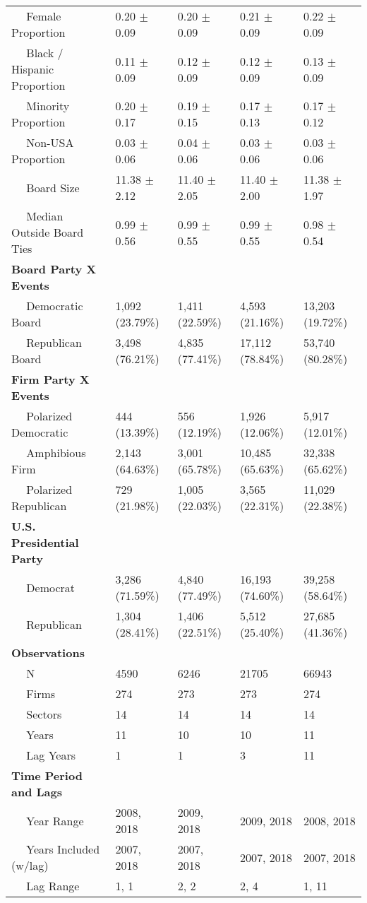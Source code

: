 \begin{tabular}{lllll}
~~ Female Proportion & 0.20 $\pm$ 0.09 & 0.20 $\pm$ 0.09 & 0.21 $\pm$ 0.09 & 0.22 $\pm$ 0.09\\
~~ Black / Hispanic Proportion & 0.11 $\pm$ 0.09 & 0.12 $\pm$ 0.09 & 0.12 $\pm$ 0.09 & 0.13 $\pm$ 0.09\\
~~ Minority Proportion & 0.20 $\pm$ 0.17 & 0.19 $\pm$ 0.15 & 0.17 $\pm$ 0.13 & 0.17 $\pm$ 0.12\\
~~ Non-USA Proportion & 0.03 $\pm$ 0.06 & 0.04 $\pm$ 0.06 & 0.03 $\pm$ 0.06 & 0.03 $\pm$ 0.06\\
\addlinespace
~~ Board Size & 11.38 $\pm$ 2.12 & 11.40 $\pm$ 2.05 & 11.40 $\pm$ 2.00 & 11.38 $\pm$ 1.97\\
~~ Median Outside Board Ties & 0.99 $\pm$ 0.56 & 0.99 $\pm$ 0.55 & 0.99 $\pm$ 0.55 & 0.98 $\pm$ 0.54\\
\bf{Board Party X Events} & ~ & ~ & ~ & ~\\
~~ Democratic Board & 1,092 (23.79\%) & 1,411 (22.59\%) & 4,593 (21.16\%) & 13,203 (19.72\%)\\
~~ Republican Board & 3,498 (76.21\%) & 4,835 (77.41\%) & 17,112 (78.84\%) & 53,740 (80.28\%)\\
\addlinespace
\bf{Firm Party X Events} & ~ & ~ & ~ & ~\\
~~ Polarized Democratic & 444 (13.39\%) & 556 (12.19\%) & 1,926 (12.06\%) & 5,917 (12.01\%)\\
~~ Amphibious Firm & 2,143 (64.63\%) & 3,001 (65.78\%) & 10,485 (65.63\%) & 32,338 (65.62\%)\\
~~ Polarized Republican & 729 (21.98\%) & 1,005 (22.03\%) & 3,565 (22.31\%) & 11,029 (22.38\%)\\
\bf{U.S. Presidential Party} & ~ & ~ & ~ & ~\\
\addlinespace
~~ Democrat & 3,286 (71.59\%) & 4,840 (77.49\%) & 16,193 (74.60\%) & 39,258 (58.64\%)\\
~~ Republican & 1,304 (28.41\%) & 1,406 (22.51\%) & 5,512 (25.40\%) & 27,685 (41.36\%)\\
\bf{Observations} & ~ & ~ & ~ & ~\\
~~ N & 4590 & 6246 & 21705 & 66943\\
~~ Firms & 274 & 273 & 273 & 274\\
\addlinespace
~~ Sectors & 14 & 14 & 14 & 14\\
~~ Years & 11 & 10 & 10 & 11\\
~~ Lag Years & 1 & 1 & 3 & 11\\
\bf{Time Period and Lags} & ~ & ~ & ~ & ~\\
~~ Year Range & 2008, 2018 & 2009, 2018 & 2009, 2018 & 2008, 2018\\
\addlinespace
~~ Years Included (w/lag) & 2007, 2018 & 2007, 2018 & 2007, 2018 & 2007, 2018\\
~~ Lag Range & 1, 1 & 2, 2 & 2, 4 & 1, 11\\
\bottomrule
\end{tabular}
